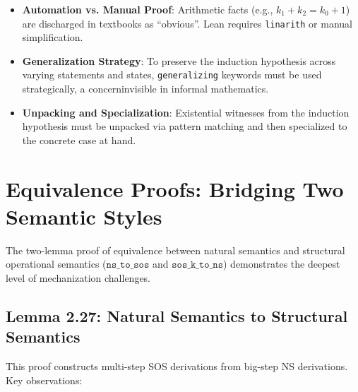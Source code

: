 \begin{itemize}
    \item \textbf{Automation vs. Manual Proof}:
    Arithmetic facts (e.g., $k_1 + k_2 = k_0 + 1$) are discharged in textbooks
    as ``obvious''. Lean requires \texttt{linarith} or manual simplification.
    
    \item \textbf{Generalization Strategy}:
    To preserve the induction hypothesis across varying statements and states,
    \texttt{generalizing} keywords must be used strategically,
    a concerninvisible in informal mathematics.
    
    \item \textbf{Unpacking and Specialization}:
    Existential witnesses from the induction hypothesis must be unpacked via
    pattern matching and then specialized to the concrete case at hand.
\end{itemize}

%
%
%
\section{Equivalence Proofs: Bridging Two Semantic Styles}
\label{discussion:sec:equivalence}

The two-lemma proof of equivalence between natural semantics and
structural operational semantics ($\texttt{ns\_to\_sos}$ and
$\texttt{sos\_k\_to\_ns}$) demonstrates the deepest level of mechanization
challenges.

\subsection*{Lemma 2.27: Natural Semantics to Structural Semantics}

This proof constructs multi-step SOS derivations from big-step NS derivations.
Key observations:

